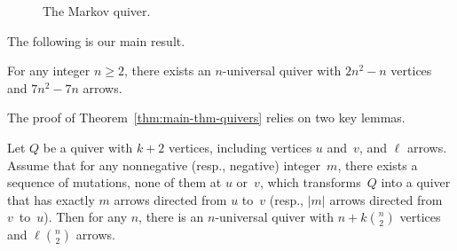 \documentclass[ALCO,ThmDefs,Unicode,epreuves,published]{cedram}
\begin{document}
\begin{figure}[ht]\centering
{}

\caption{The Markov quiver. }
\label{fig:Markov-quiver}
\end{figure}

The following is our main result. 

\begin{theorem}
\label{thm:main-thm-quivers}
For any integer $n\ge 2$, there exists an $n$-universal quiver with $2n^2-n$ vertices and $7n^2-7n$ arrows. 
\end{theorem}

The proof of Theorem~\ref{thm:main-thm-quivers} relies on two key lemmas.

\begin{lemma}
\label{lem:gluing}
Let $Q$ be a quiver with $k+2$ vertices, including vertices $u$ and~$v$, and $\ell$ arrows. Assume that for any nonnegative (resp., negative) integer~$m$, there exists a sequence of mutations, none of them at $u$ or~$v$, which transforms~$Q$ into a quiver that has exactly $m$ arrows directed from $u$ to~$v$ (resp., $|m|$ arrows directed from~$v$~to~$u$). %
Then for any $n$, there is an $n$-universal quiver with $n+k\binom{n}{2}$ vertices and $\ell\binom{n}{2}$ arrows. 
\end{lemma}
\end{document}
